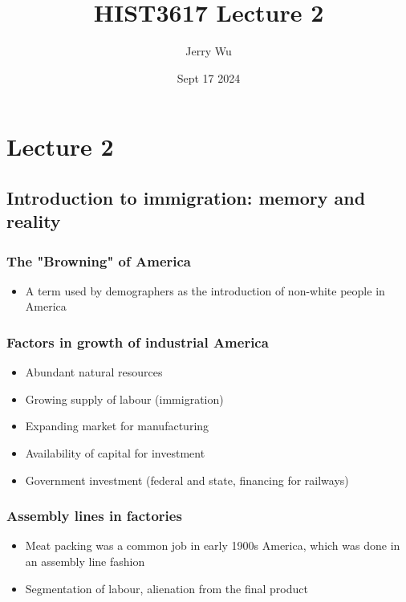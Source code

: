\documentclass[12pt]{book}
\title{HIST3617 Lecture 2}
\author{Jerry Wu}
\date{Sept 17 2024}
\begin{document}
\maketitle

\tableofcontents

\chapter{Lecture 2}

\section{Introduction to immigration: memory and reality}

\subsection{The "Browning" of America}

\begin{itemize}
  \item A term used by demographers as the introduction of non-white people in America
\end{itemize}

\subsection{Factors in growth of industrial America}
\begin{itemize}
  \item Abundant natural resources
  \item Growing supply of labour (immigration)
  \item Expanding market for manufacturing
  \item Availability of capital for investment
  \item Government investment (federal and state, financing for railways)
\end{itemize}

\subsection{Assembly lines in factories}

\begin{itemize}
  \item Meat packing was a common job in early 1900s America, which was done in an assembly line fashion
  \item Segmentation of labour, alienation from the final product
\end{itemize}
\end{document}
